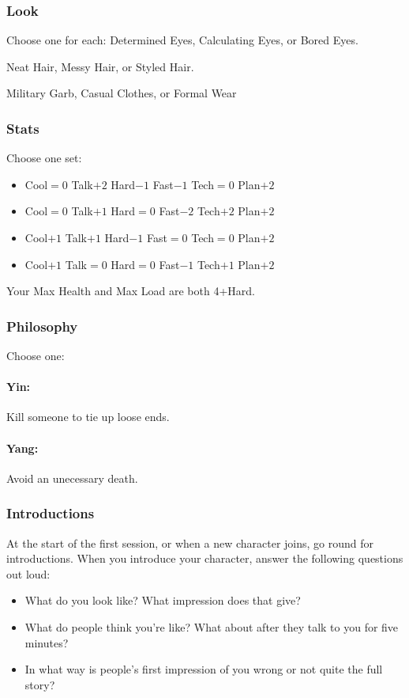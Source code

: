 \subsubsection{Look}
Choose one for each:
Determined Eyes, Calculating Eyes, or Bored Eyes.

Neat Hair, Messy Hair, or Styled Hair.

Military Garb, Casual Clothes, or Formal Wear

\subsubsection{Stats}
Choose one set:
\begin{itemize}
\setlength\itemsep{0em}
\item Cool${=}0$ Talk$+2$ Hard$-1$ Fast$-1$ Tech${=}0$ Plan$+2$
\item Cool${=}0$ Talk$+1$ Hard${=}0$ Fast$-2$ Tech$+2$ Plan$+2$
\item Cool$+1$ Talk$+1$ Hard$-1$ Fast${=}0$ Tech${=}0$ Plan$+2$
\item Cool$+1$ Talk${=}0$ Hard${=}0$ Fast$-1$ Tech$+1$ Plan$+2$
\end{itemize}

Your Max Health and Max Load are both 4+Hard.

\subsubsection{Philosophy}
Choose one:
\paragraph{Yin:} Kill someone to tie up loose ends.
\paragraph{Yang:} Avoid an unecessary death.

\subsubsection{Introductions}
At the start of the first session, or when a new character joins, go round for introductions.
When you introduce your character, answer the following questions out loud:
\begin{itemize}
\item What do you look like? What impression does that give?
\item What do people think you're like? What about after they talk to you for five minutes?
\item In what way is people's first impression of you wrong or not quite the full story?
\end{itemize}

